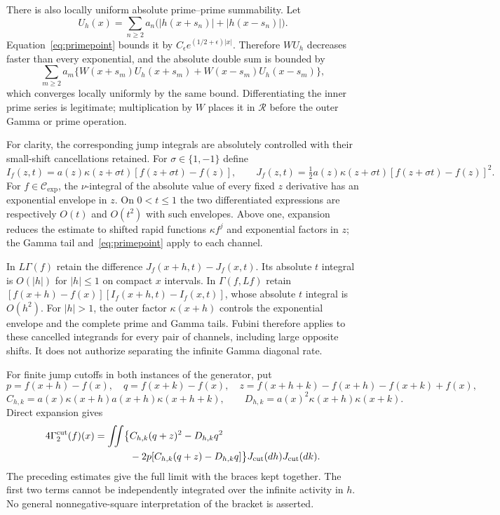\documentclass[11pt,a4paper]{article}
\numberwithin{equation}{section}
\theoremstyle{definition}
\theoremstyle{remark}
\newcommand{\RR}{\mathcal R}
\newcommand{\CE}{\mathcal C_{\exp}}
\begin{document}
There is also locally uniform absolute prime--prime summability. Let
\[
 U_h(x)=\sum_{n\ge2}a_n\bigl(|h(x+s_n)|+|h(x-s_n)|\bigr).
\]
Equation~\eqref{eq:primepoint} bounds it by $C_\epsilon e^{(1/2+\epsilon)|x|}$. Therefore $WU_h$ decreases faster than every exponential, and the absolute double sum is bounded by
\[
 \sum_{m\ge2}a_m\{W(x+s_m)U_h(x+s_m)+W(x-s_m)U_h(x-s_m)\},
\]
which converges locally uniformly by the same bound. Differentiating the inner prime series is legitimate; multiplication by $W$ places it in $\RR$ before the outer Gamma or prime operation.

For clarity, the corresponding jump integrals are absolutely controlled with their small-shift cancellations retained. For $\sigma\in\{1,-1\}$ define
\[
 I_f(z,t)=a(z)\kappa(z+\sigma t)[f(z+\sigma t)-f(z)],\qquad
 J_f(z,t)=\tfrac12a(z)\kappa(z+\sigma t)[f(z+\sigma t)-f(z)]^2.
\]
For $f\in\CE$, the $\nu$-integral of the absolute value of every fixed $z$ derivative has an exponential envelope in $z$. On $0<t\le1$ the two differentiated expressions are respectively $O(t)$ and $O(t^2)$ with such envelopes. Above one, expansion reduces the estimate to shifted rapid functions $\kappa f^j$ and exponential factors in $z$; the Gamma tail and~\eqref{eq:primepoint} apply to each channel.

In $L\Gamma(f)$ retain the difference $J_f(x+h,t)-J_f(x,t)$. Its absolute $t$ integral is $O(|h|)$ for $|h|\le1$ on compact $x$ intervals. In $\Gamma(f,Lf)$ retain
$[f(x+h)-f(x)][I_f(x+h,t)-I_f(x,t)]$, whose absolute $t$ integral is $O(h^2)$. For $|h|>1$, the outer factor $\kappa(x+h)$ controls the exponential envelope and the complete prime and Gamma tails. Fubini therefore applies to these cancelled integrands for every pair of channels, including large opposite shifts. It does not authorize separating the infinite Gamma diagonal rate.

For finite jump cutoffs in both instances of the generator, put
\[
 p=f(x+h)-f(x),\quad q=f(x+k)-f(x),\quad
 z=f(x+h+k)-f(x+h)-f(x+k)+f(x),
\]
\[
 C_{h,k}=a(x)\kappa(x+h)a(x+h)\kappa(x+h+k),\qquad
 D_{h,k}=a(x)^2\kappa(x+h)\kappa(x+k).
\]
Direct expansion gives
\begin{align}\label{eq:doublejump}
 4\Gamma_2^{\mathrm{cut}}(f)(x)
 =\iint\bigl\{&C_{h,k}(q+z)^2-D_{h,k}q^2\notag\\
 &-2p[C_{h,k}(q+z)-D_{h,k}q]\bigr\}
     J_{\mathrm{cut}}(dh)J_{\mathrm{cut}}(dk).
\end{align}
The preceding estimates give the full limit with the braces kept together. The first two terms cannot be independently integrated over the infinite activity in $h$. No general nonnegative-square interpretation of the bracket is asserted.
\end{document}
